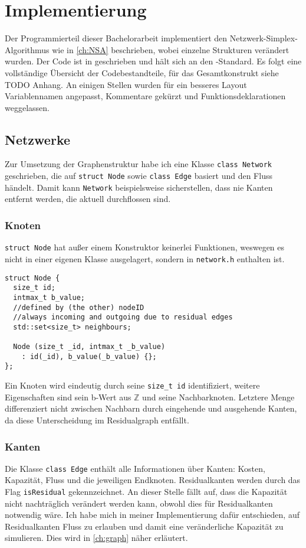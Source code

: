 \chapter{Implementierung} \label{ch:prog}
Der Programmierteil dieser Bachelorarbeit implementiert den Netzwerk-Simplex-Algorithmus wie in \cref{ch:NSA} beschrieben, wobei einzelne Strukturen verändert wurden. Der Code ist in \cpp  geschrieben und hält sich an den \cppelf-Standard. Es folgt eine vollständige Übersicht der Codebestandteile, für das Gesamtkonstrukt siehe TODO Anhang. An einigen Stellen wurden für ein besseres Layout Variablennamen angepasst, Kommentare gekürzt und Funktionsdeklarationen weggelassen.

\section{Netzwerke}
Zur Umsetzung der Graphenstruktur habe ich eine Klasse \lstinline|class Network| geschrieben, die auf \lstinline|struct Node| sowie \lstinline|class Edge| basiert und den Fluss händelt. Damit kann \lstinline|Network| beispielsweise sicherstellen, dass nie Kanten entfernt werden, die aktuell durchflossen sind.

\subsection{Knoten}
\lstinline|struct Node| hat außer einem Konstruktor keinerlei Funktionen, weswegen es nicht in einer eigenen Klasse ausgelagert, sondern in \lstinline|network.h| enthalten ist. 

\begin{lstlisting}
struct Node {
  size_t id;
  intmax_t b_value;
  //defined by (the other) nodeID
  //always incoming and outgoing due to residual edges
  std::set<size_t> neighbours;

  Node (size_t _id, intmax_t _b_value)
    : id(_id), b_value(_b_value) {};
};
\end{lstlisting}

Ein Knoten wird eindeutig durch seine \lstinline|size_t id| identifiziert, weitere Eigenschaften sind sein b-Wert aus $\mathbb{Z}$ und seine Nachbarknoten. Letztere Menge differenziert nicht zwischen Nachbarn durch eingehende und ausgehende Kanten, da diese Unterscheidung im Residualgraph entfällt.

\subsection{Kanten}
Die Klasse \lstinline|class Edge| enthält alle Informationen über Kanten: Kosten, Kapazität, Fluss und die jeweiligen Endknoten. Residualkanten werden durch das Flag \lstinline|isResidual| gekennzeichnet. An dieser Stelle fällt auf, dass die Kapazität nicht nachträglich verändert werden kann, obwohl dies für Residualkanten notwendig wäre. Ich habe mich in meiner Implementierung dafür entschieden, auf Residualkanten Fluss zu erlauben und damit eine veränderliche Kapazität zu simulieren. Dies wird in \cref{ch:graph} näher erläutert.

